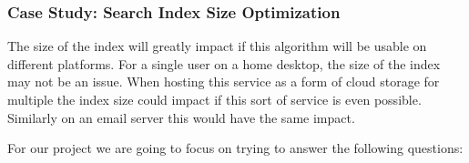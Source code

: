 \subsubsection {Case Study: Search Index Size Optimization}
\label{subsec:size}


The size of the index will greatly impact if this algorithm will be usable on different platforms.
For a single user on a home desktop, the size of the index may not be an issue.
When hosting this service as a form of cloud storage for multiple the index size could impact if this sort of service is even possible.
Similarly on an email server this would have the same impact.

For our project we are going to focus on trying to answer the following questions:

